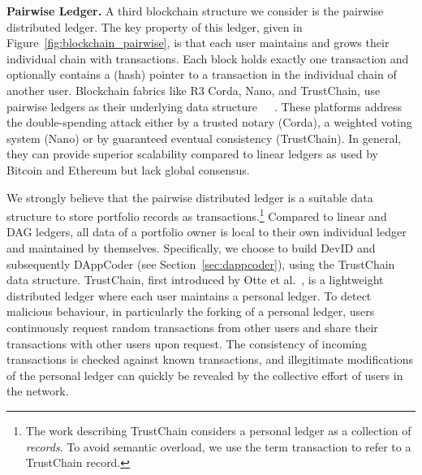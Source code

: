 \textbf{Pairwise Ledger.} A third blockchain structure we consider is the pairwise distributed ledger.
The key property of this ledger, given in Figure~\ref{fig:blockchain_pairwise}, is that each user maintains and grows their individual chain with transactions.
Each block holds exactly one transaction and optionally contains a (hash) pointer to a transaction in the individual chain of another user.
Blockchain fabrics like R3 Corda, Nano, and TrustChain, use pairwise ledgers as their underlying data structure~\cite{otte2017trustchain}~\cite{lemahieu2017raiblocks}~\cite{brown2017introducing}.
These platforms address the double-spending attack either by a trusted notary (Corda), a weighted voting system (Nano) or by guaranteed eventual consistency (TrustChain).
In general, they can provide superior scalability compared to linear ledgers as used by Bitcoin and Ethereum but lack global consensus.

We strongly believe that the pairwise distributed ledger is a suitable data structure to store portfolio records as transactions.\footnote{The work describing TrustChain considers a personal ledger as a collection of \emph{records}. To avoid semantic overload, we use the term transaction to refer to a TrustChain record.}
Compared to linear and DAG ledgers, all data of a portfolio owner is local to their own individual ledger and maintained by themselves.
Specifically, we choose to build DevID and subsequently DAppCoder (see Section~\ref{sec:dappcoder}), using the TrustChain data structure.
TrustChain, first introduced by Otte et al.~\cite{otte2017trustchain}, is a lightweight distributed ledger where each user maintains a personal ledger.
To detect malicious behaviour, in particularly the forking of a personal ledger, users continuously request random transactions from other users and share their transactions with other users upon request.
The consistency of incoming transactions is checked against known transactions, and illegitimate modifications of the personal ledger can quickly be revealed by the collective effort of users in the network.

